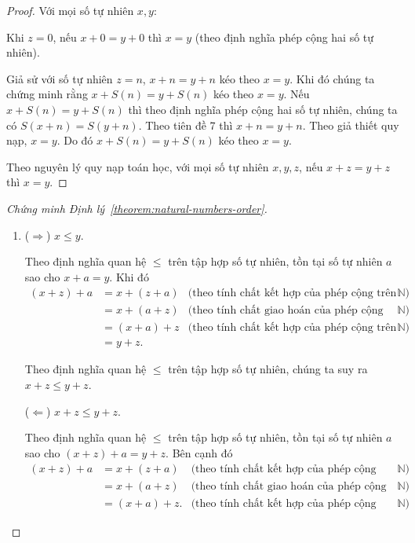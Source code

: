 \begin{proof}
	Với mọi số tự nhiên $x, y$:

	Khi $z = 0$, nếu $x + 0 = y + 0$ thì $x = y$ (theo định nghĩa phép cộng hai số tự nhiên).

	Giả sử với số tự nhiên $z = n$, $x + n = y + n$ kéo theo $x = y$. Khi đó chúng ta chứng minh rằng $x + S(n) = y + S(n)$ kéo theo $x = y$. Nếu $x + S(n) = y + S(n)$ thì theo định nghĩa phép cộng hai số tự nhiên, chúng ta có $S(x + n) = S(y + n)$. Theo tiên đề 7 thì $x + n = y + n$. Theo giả thiết quy nạp, $x = y$. Do đó $x + S(n) = y + S(n)$ kéo theo $x = y$.

	Theo nguyên lý quy nạp toán học, với mọi số tự nhiên $x, y, z$, nếu $x + z = y + z$ thì $x = y$.
\end{proof}

\begin{proof}[Chứng minh Định lý~\ref{theorem:natural-numbers-order}]
	\begin{enumerate}[label={(\roman*)}]
		\item ($\Rightarrow$) $x\leq y$.

		      Theo định nghĩa quan hệ $\leq$ trên tập hợp số tự nhiên, tồn tại số tự nhiên $a$ sao cho $x + a = y$. Khi đó
		      \begin{align*}
			      (x + z) + a & = x + (z + a) & \text{(theo tính chất kết hợp của phép cộng trên $\mathbb{N}$)}   \\
			                  & = x + (a + z) & \text{(theo tính chất giao hoán của phép cộng trên $\mathbb{N}$)} \\
			                  & = (x + a) + z & \text{(theo tính chất kết hợp của phép cộng trên $\mathbb{N}$)}   \\
			                  & = y + z.
		      \end{align*}

		      Theo định nghĩa quan hệ $\leq$ trên tập hợp số tự nhiên, chúng ta suy ra $x + z\leq y + z$.

		      ($\Leftarrow$) $x + z\leq y + z$.

		      Theo định nghĩa quan hệ $\leq$ trên tập hợp số tự nhiên, tồn tại số tự nhiên $a$ sao cho $(x + z) + a = y + z$. Bên cạnh đó
		      \begin{align*}
			      (x + z) + a & = x + (z + a)  & \text{(theo tính chất kết hợp của phép cộng trên $\mathbb{N}$)}   \\
			                  & = x + (a + z)  & \text{(theo tính chất giao hoán của phép cộng trên $\mathbb{N}$)} \\
			                  & = (x + a) + z. & \text{(theo tính chất kết hợp của phép cộng trên $\mathbb{N}$)}
		      \end{align*}


\end{enumerate}
\end{proof}
